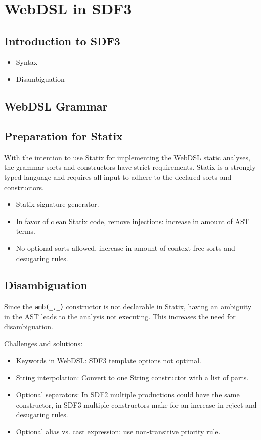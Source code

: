 
\chapter{\label{chap:sdf3}WebDSL in SDF3}

  \section{Introduction to SDF3}

    \begin{itemize}
      \item Syntax
      \item Disambiguation
    \end{itemize}
  
  \section{WebDSL Grammar}

  \section{Preparation for Statix}

    With the intention to use Statix for implementing the WebDSL static analyses, the grammar sorts and constructors have strict requirements. Statix is a strongly typed language and requires all input to adhere to the declared sorts and constructors.

    \begin{itemize}
      \item Statix signature generator.
      \item In favor of clean Statix code, remove injections: increase in amount of AST terms.
      \item No optional sorts allowed, increase in amount of context-free sorts and desugaring rules.
    \end{itemize}

  \section{Disambiguation}
  
    Since the \texttt{amb(\_,\_)} constructor is not declarable in Statix, having an ambiguity in the AST leads to the analysis not executing. This increases the need for disambiguation.

    Challenges and solutions:
    \begin{itemize}
      \item Keywords in WebDSL: SDF3 template options not optimal.
      \item String interpolation: Convert to one String constructor with a list of parts.
      \item Optional separators: In SDF2 multiple productions could have the same constructor, in SDF3 multiple constructors make for an increase in reject and desugaring rules.
      \item Optional alias vs. cast expression: use non-transitive priority rule.
    \end{itemize}
